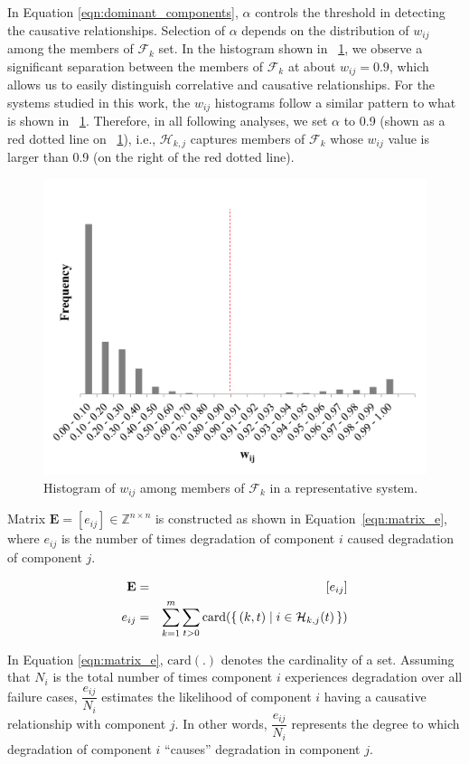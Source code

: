 \documentclass[12pt]{elsarticle}
\begin{document}
In Equation \eqref{eqn:dominant_components}, $\alpha$ controls the threshold in detecting the causative relationships. Selection of $\alpha$ depends on the distribution of $w_{ij}$ among the members of $\mathcal{F}_{k}$ set. In the histogram shown in \figurename~\ref{wij_hist}, we observe a significant separation between the members of $\mathcal{F}_{k}$ at about $w_{ij} = 0.9$, which allows us to easily distinguish correlative and causative relationships. For the systems studied in this work, the $w_{ij}$ histograms follow a similar pattern to what is shown in \figurename~\ref{wij_hist}. Therefore, in all following analyses, we set $\alpha$ to 0.9 (shown as a red dotted line on \figurename~\ref{wij_hist}), i.e., $\mathcal{H}_{k, j}$ captures members of $\mathcal{F}_{k}$ whose $w_{ij}$ value is larger than 0.9 (on the right of the red dotted line).

\begin{figure}
\centering
\includegraphics[width=0.7\columnwidth]{wij_hist}
\caption{Histogram of $w_{ij}$ among members of $\mathcal{F}_{k}$ in a representative system.}
\label{wij_hist}
\end{figure}

Matrix $\mathbf{E} = \left[e_{ij}\right] \in \mathbb{Z}^{n \times n}$ is constructed as shown in Equation~\eqref{eqn:matrix_e}, where $e_{ij}$ is the number of times degradation of component $i$ caused degradation of component $j$.

\begin{eqnarray}
\label{eqn:matrix_e}
\mathbf{E} &=& \left[e_{ij}\right] \nonumber \\
e_{ij} &=& \sum\limits_{k=1}^{m} \sum\limits_{t > 0} \text{card}({\set{(k, t) |i \in \mathcal{H}_{k, j}(t)}})
\end{eqnarray}

In Equation \eqref{eqn:matrix_e}, $\text{card}(.)$ denotes the cardinality of a set. Assuming that $N_i$ is the total number of times component $i$ experiences degradation over all failure cases, $\dfrac{e_{ij}}{N_i}$ estimates the likelihood of component $i$ having a causative relationship with component $j$. In other words, $\dfrac{e_{ij}}{N_i}$ represents the degree to which degradation of component $i$ ``causes'' degradation in component $j$.
\end{document}
